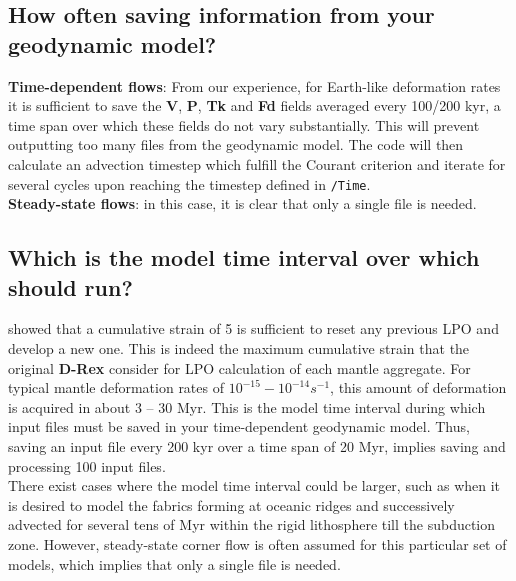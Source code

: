 \subsection{How often saving information from your geodynamic model?}
\label{section:often}
\textbf{Time-dependent flows}: From our experience, for Earth-like deformation rates it is sufficient to save the \textbf{V}, \textbf{P}, \textbf{Tk} and \textbf{Fd} fields averaged every 100/200 kyr, a time span over which these fields do not vary substantially. This will prevent outputting too many files from the geodynamic model. The code will then calculate an advection timestep which fulfill the Courant criterion and iterate for several cycles upon reaching the timestep defined in \texttt{/Time}.\\

\textbf{Steady-state flows}: in this case, it is clear that only a single \vtptitle{} file is needed.

\subsection{Which is the model time interval over which \drexmtitle{} should run?}
\citep{boneh2014epsl} showed that a cumulative strain of 5 is sufficient to reset any previous LPO and develop a new one. This is indeed the maximum cumulative strain that the original \textbf{D-Rex} consider for LPO calculation of each mantle aggregate.
For typical mantle deformation rates of $10^{-15}-10^{-14}    s^{-1}$, this amount of deformation is acquired in about  3 – 30 Myr. This is the model time interval during which input \vtptitle{} files must be saved in your time-dependent geodynamic model. Thus, saving an input \vtptitle{} file every 200 kyr over a time span of 20 Myr, implies saving and processing 100 input files.\\
There exist cases where the model time interval could be larger, such as when it is desired to model the fabrics forming at oceanic ridges and successively advected for several tens of Myr within the rigid lithosphere till the subduction zone. However, steady-state corner flow is often assumed for this particular set of models, which implies that only a single \vtptitle{} file is needed.

